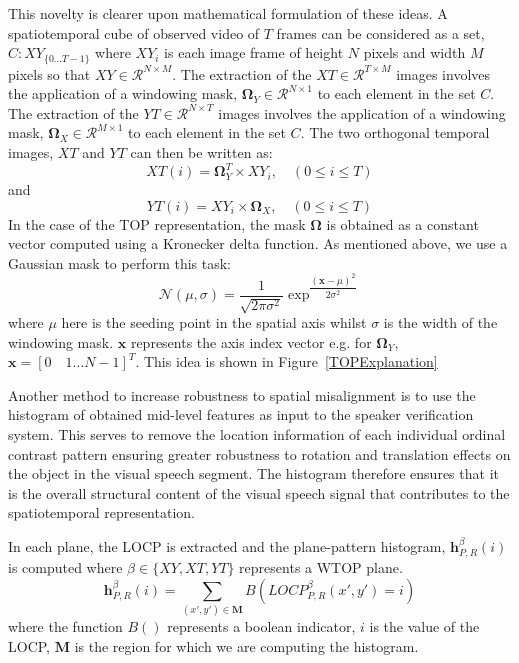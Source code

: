 \documentclass[a4paper, 10pt, conference]{ieeeconf}      %
\begin{document}
This novelty is clearer upon mathematical formulation of these ideas. 
A spatiotemporal cube of observed video of $T$ frames can be considered as a set, $C:XY_{\{0\ldots T-1\}}$ where $XY_{i}$ is each image frame of height $N$ pixels and width $M$ pixels so that $XY\in \mathcal{R}^{N \times M}$. 
The extraction of the $XT \in \mathcal{R}^{T \times M}$ images involves the application of a windowing mask, $\bm{\Omega}_{Y} \in \mathcal{R}^{N \times 1}$  to each element in the set $C$. 
The extraction of the $YT \in \mathcal{R}^{N \times T}$ images involves the application of a windowing mask, $\bm{\Omega}_{X} \in \mathcal{R}^{M \times 1}$  to each element in the set $C$. 
The two orthogonal temporal images, $XT$ and $YT$ can then be written as:
\begin{equation}
 XT(i) = \bm{\Omega}_{Y}^{T} \times XY_{i}, \quad (0\leq i \leq T)
\end{equation}
and
\begin{equation}
 YT(i) = XY_{i} \times \bm{\Omega}_{X}, \quad (0\leq i \leq T)
\end{equation}
In the case of the TOP representation, the mask $\bm{\Omega}$ is obtained as a constant vector computed using a Kronecker delta function.
As mentioned above, we use a Gaussian mask to perform this task:
\begin{equation}
 \mathcal{N}(\mu,\sigma) = \dfrac{1}{\sqrt{2\pi\sigma^2}}\exp^{\dfrac{(\bm{x}-\mu)^2}{2\sigma^2}}
\end{equation}
where $\mu$ here is the seeding point in the spatial axis whilst $\sigma$ is the width of the windowing mask.
$\bm{x}$ represents the axis index vector e.g. for $\bm{\Omega}_{Y}$, $\bm{x} = [0 \quad 1 \ldots N-1]^T$.  
This idea is shown in Figure~\ref{TOPExplanation}

Another method to increase robustness to spatial misalignment is to use the histogram of obtained mid-level features as input to the speaker verification system.
This serves to remove the location information of each individual ordinal contrast pattern ensuring greater robustness to rotation and translation effects on the object in the visual speech segment.
The histogram therefore ensures that it is the overall structural content of the visual speech signal that contributes to the spatiotemporal representation.

In each plane, the LOCP is extracted and the plane-pattern histogram, $\bm{h}^{\beta}_{P,R}(i)$ is computed where $\beta\in\{XY,XT,YT\}$ represents a WTOP plane.
\begin{equation}
 \bm{h}^{\beta}_{P,R} (i) = \sum_{(x',y')\in \bm{M}} B(LOCP_{P,R}^{\beta}(x',y')=i)
\end{equation}
where the function $B()$ represents a boolean indicator, $i$ is the value of the LOCP, $\bm{M}$ is the region for which we are computing the histogram.
\end{document}
